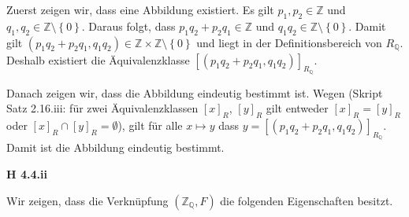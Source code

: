 \documentclass[12pt]{extarticle}
\begin{document}
\vspace{4mm}

Zuerst zeigen wir, dass eine Abbildung existiert.  Es gilt
\(p_1, p_2 \in \mathbb{Z}\) und
\(q_1, q_2 \in \mathbb{Z} \setminus \left\{ 0 \right\}\).  Daraus folgt,
dass \(p_1q_2+p_2q_1 \in \mathbb{Z}\) und
\(q_1q_2 \in \mathbb{Z} \setminus \left\{ 0 \right\}\).  Damit gilt
$(p_1q_2+p_2q_1,q_1q_2) \in \mathbb{Z} \times \mathbb{Z} \setminus
\left\{ 0 \right\}$ und liegt in der Definitionsbereich von
\(R_{\mathbb{Q}}\).  Deshalb existiert die Äquivalenzklasse
\([(p_1q_2+p_2q_1,q_1q_2)]_{R_{\mathbb{Q}}}\).

\vspace{4mm}

Danach zeigen wir, dass die Abbildung eindeutig bestimmt ist.  Wegen
(Skript Satz 2.16.iii:  für zwei Äquivalenzklassen \([x]_R\), \([y]_R\)
gilt entweder \([x]_R=[y]_R\) oder \([x]_R \cap [y]_R = \emptyset\)), gilt
für alle \(x \mapsto y\) dass $y =
[(p_1q_2+p_2q_1,q_1q_2)]_{R_{\mathbb{Q}}}$.  Damit ist die Abbildung
eindeutig bestimmt.

\vspace{4mm}

\textbf{H 4.4.ii}

Wir zeigen, dass die Verknüpfung \((\mathbb{Z}_{\mathbb{Q}}, F)\) die
folgenden Eigenschaften besitzt.
\end{document}

